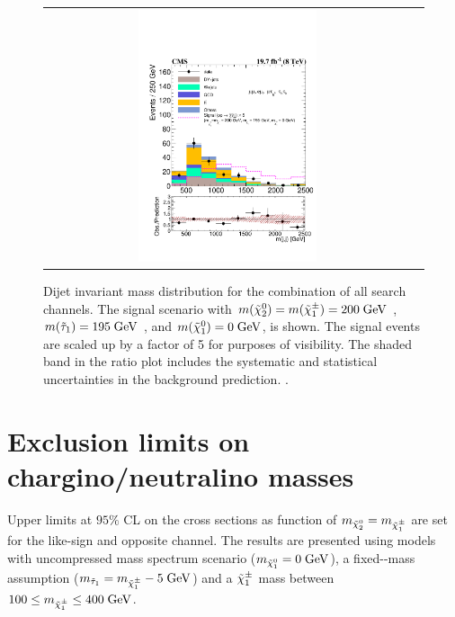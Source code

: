 \begin{figure}[tbh!]
	\centering
	\begin{tabular}{cc}
		\includegraphics[width=0.50\textwidth]{PLOTS/CMS-SUS-14-005_Figure_005.pdf}
	\end{tabular}
	\caption{Dijet invariant mass distribution for the combination of all search channels. The signal scenario with $m(\tilde{\chi}^{0}_{2})= m(\tilde{\chi}^{\pm}_{1}) =  200\;\text{Ge}\kern-0.06667em\text{V}$ , $m(\tilde{\tau}_{1})= 195\;\text{Ge}\kern-0.06667em\text{V}$ , and $m(\tilde{\chi}^{0}_{1}) = 0\;\text{Ge}\kern-0.06667em\text{V}$, is shown. The signal events are scaled up by a factor of 5 for purposes of visibility. The shaded band in the ratio plot includes the systematic and statistical uncertainties in the background prediction. \cite{Khachatryan:2015kxa}.}
	\label{fig::mjj_combined_allchannels}
\end{figure} 

\clearpage

\section{Exclusion limits on chargino/neutralino masses}
\FloatBarrier

Upper limits at $95\%$ CL on the cross sections as function of $m_{\tilde{\chi}^{0}_{2}}=m_{\tilde{\chi}^{\pm}_{1}}$ are set for the \hadtau\hadtau like-sign and opposite channel. The results are presented using models with uncompressed mass spectrum scenario ($m_{\tilde{\chi}^{0}_{1}} = 0\;\text{Ge}\kern-0.06667em\text{V}$), a fixed-\stau-mass assumption ($m_{\tilde{\tau}_{1}} =  m_{\tilde{\chi}^{\pm}_{1}} - 5\;\text{Ge}\kern-0.06667em\text{V}$) and
a $\tilde{\chi}^{\pm}_{1}$ mass between $100 \leq m_{\tilde{\chi}^{\pm}_{1}} \leq 400\;\text{Ge}\kern-0.06667em\text{V}$.

